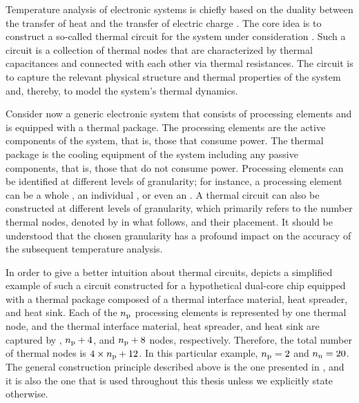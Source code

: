 Temperature analysis of electronic systems is chiefly based on the duality
between the transfer of heat and the transfer of electric charge
\cite{kreith2000}. The core idea is to construct a so-called thermal 
circuit for the system under consideration \cite{skadron2003}. Such a circuit is
a collection of thermal nodes that are characterized by thermal capacitances and
connected with each other via thermal resistances. The circuit is to capture the
relevant physical structure and thermal properties of the system and, thereby,
to model the system's thermal dynamics.

Consider now a generic electronic system that consists of \np processing
elements and is equipped with a thermal package. The processing elements are the
active components of the system, that is, those that consume power. The thermal
package is the cooling equipment of the system including any passive components,
that is, those that do not consume power. Processing elements can be identified
at different levels of granularity; for instance, a processing element can be a
whole , an individual , or even an . A thermal 
circuit can also be constructed at different levels of granularity, which
primarily refers to the number thermal nodes, denoted by \nn in what follows,
and their placement. It should be understood that the chosen granularity has a
profound impact on the accuracy of the subsequent temperature analysis.

In order to give a better intuition about thermal  circuits,
 depicts a simplified example of such a circuit
constructed for a hypothetical dual-core chip equipped with a thermal package
composed of a thermal interface material, heat spreader, and heat sink. Each of
the ${n_\mathrm{p}}$ processing elements is represented by one thermal node, and the
thermal interface material, heat spreader, and heat sink are captured by \np,
${n_\mathrm{p}} + 4$, and ${n_\mathrm{p}} + 8$ nodes, respectively. Therefore, the total number of
thermal nodes \nn is $4 \times {n_\mathrm{p}} + 12$. In this particular example, ${n_\mathrm{p}} = 2$
and ${n_\mathrm{n}} = 20$. The general construction principle described above is the one
presented in \cite{huang2008}, and it is also the one that is used throughout
this thesis unless we explicitly state otherwise.

